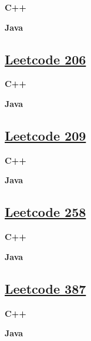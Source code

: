 \textbf{C++}\par


\textbf{Java}\par



\subsection{\href{https://leetcode-cn.com/}{Leetcode 206}}\label{app:codelist:leetcode:206}

\textbf{C++}\par


\textbf{Java}\par



\subsection{\href{https://leetcode-cn.com/}{Leetcode 209}}\label{app:codelist:leetcode:209}

\textbf{C++}\par


\textbf{Java}\par



\subsection{\href{https://leetcode-cn.com/}{Leetcode 258}}\label{app:codelist:leetcode:258}

\textbf{C++}\par


\textbf{Java}\par



\subsection{\href{https://leetcode-cn.com/}{Leetcode 387}}\label{app:codelist:leetcode:387}

\textbf{C++}\par


\textbf{Java}\par



